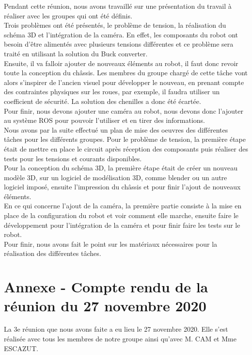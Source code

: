 \documentclass{PackagerQualityN}
\begin{document}
Pendant cette réunion, nous avons travaillé sur une présentation du travail à réaliser avec les groupes qui ont été définis.\\

Trois problèmes ont été présentés, le problème de tension, la réalisation du schéma 3D et l'intégration de la caméra.
En effet, les composants du robot ont besoin d’être alimentés avec plusieurs tensions différentes et ce problème sera traité en utilisant la solution du Buck converter.\\

Ensuite, il va falloir ajouter de nouveaux éléments au robot, il faut donc revoir toute la conception du châssis.
Les membres du groupe chargé de cette tâche vont alors s’inspirer de l’ancien visuel pour développer le nouveau, en prenant compte des contraintes physiques sur les roues, par exemple, il faudra utiliser un coefficient de sécurité.
La solution des chenilles a donc été écartée.\\

Pour finir, nous devons ajouter une caméra au robot, nous devons donc l’ajouter au système ROS pour pouvoir l’utiliser et en tirer des informations.\\

Nous avons par la suite effectué un plan de mise des oeuvres des différentes tâches pour les différents groupes.
Pour le problème de tension, la première étape était de mettre en place le circuit après réception des composants puis réaliser des tests pour les tensions et courants disponibles.\\

Pour la conception du schéma 3D, la première étape était de créer un nouveau modèle 3D, sur un logiciel de modélisation 3D, comme blender ou un autre logiciel imposé, ensuite l'impression du châssis et pour finir l'ajout de nouveaux éléments.\\

En ce qui concerne l'ajout de la caméra, la première partie consiste à la mise en place de la configuration du robot et voir comment elle marche, ensuite faire le développement pour l'intégration de la caméra et pour finir faire les tests sur le robot.\\

Pour finir, nous avons fait le point sur les matériaux nécessaires pour la réalisation des différentes tâches.

\newp
\section*{Annexe - Compte rendu de la réunion du 27 novembre 2020}
La 3e réunion que nous avons faite a eu lieu le 27 novembre 2020. Elle s'est réalisée avec tous les membres de notre groupe ainsi qu'avec M. CAM et Mme ESCAZUT.\\
\end{document}
